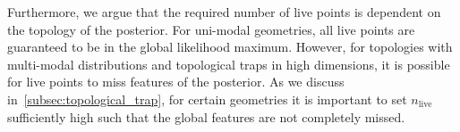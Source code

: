 \documentclass[11pt]{article}
\begin{document}
    Furthermore, we argue that the required number of live points is dependent on the topology of the posterior.
    For uni-modal geometries, all live points are guaranteed to be in the global likelihood maximum.
    However, for topologies with multi-modal distributions and topological traps in high dimensions,
    it is possible for live points to miss features of the posterior.
    As we discuss in~\ref{subsec:topological_trap}, for certain geometries it is important to
    set $n_{\text{live}}$ sufficiently high such that the global features are not completely missed.

    
\end{document}
